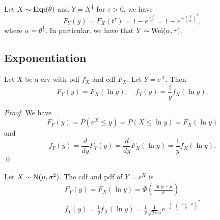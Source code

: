 \documentclass[notoc,notitlepage]{tufte-book}
\begin{document}
\begin{eg}
  Let $X \sim \operatorname{Exp}(\theta)$ and $Y = X^{\frac{1}{\tau}}$ for $\tau > 0$, we have
  \begin{equation*}
    F_Y(y) = F_X\left(t^{\tau}\right) = 1 - e^{ \frac{-y^\tau}{\theta} } = 1 - e^{-{\left( \frac{y}{\alpha} \right)}^\tau},
  \end{equation*}
  where $\alpha = \theta^{\frac{1}{\tau}}$. In particular, we have that $Y \sim \operatorname{Wei}(\alpha, \tau)$.
\end{eg}


\subsection{Exponentiation}%
\label{sub:exponentiation}

\begin{propo}\label{propo:exponentiation_method}
  Let $X$ be a crv with pdf $f_X$ and cdf $F_X$. Let $Y = e^X$. Then
  \begin{equation*}
    F_Y(y) = F_X(\ln y), \quad f_Y(y) = \frac{1}{y} f_X(\ln y).
  \end{equation*}
\end{propo}

\begin{proof}
  We have
  \begin{equation*}
    F_Y(y) = P\left( e^X \leq y \right) = P( X \leq \ln y ) = F_X(\ln y)
  \end{equation*}
  and
  \begin{equation*}
    f_Y(y) = \frac{d}{dy} F_Y(y) = \frac{d}{dy} F_X(\ln y) = \frac{1}{y} f_X(\ln y).
  \end{equation*}\qed\
\end{proof}

\begin{ex}\label{eg:lognormal_distribution}
  Let $X \sim \operatorname{N}(\mu, \sigma^2)$. The cdf and pdf of $Y = e^X$ is
  \begin{gather*}
    F_Y(y) = F_X(\ln y) = \Phi\left( \frac{\ln y - \mu}{\sigma} \right) \\
    f_Y(y) = \frac{1}{y} f_X(\ln y) = \frac{1}{y} \frac{1}{\sqrt{2 \pi} \sigma} e^{-\frac{1}{2} \cdot {\left( \frac{\ln y - \mu}{\sigma} \right)}^2}
  \end{gather*}
\end{ex}

\end{document}
